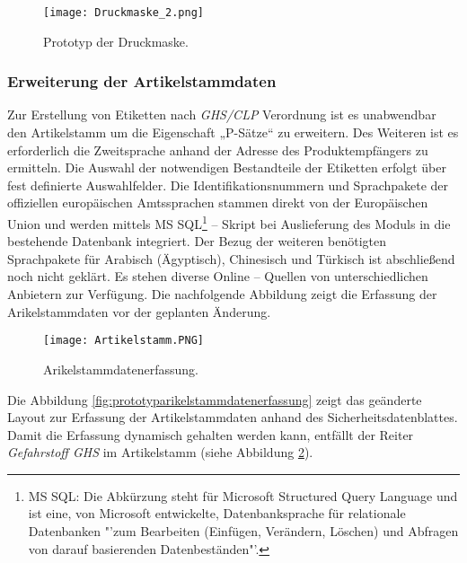 \begin{figure}[H]
    \centering
    \texttt{[image: Druckmaske\_2.png]}
    \caption[Prototyp der Druckmaske]{\small{Prototyp der Druckmaske. \cite{fzp}}}
    \label{fig:prototypdruckmaske}
\end{figure}

\subsubsection{Erweiterung der Artikelstammdaten}
\label{subsubsec:erweiterungartikelstamm}

Zur Erstellung von Etiketten nach \emph{GHS/CLP} Verordnung ist es unabwendbar den 
Artikelstamm um die Eigenschaft „P-Sätze“ zu erweitern. Des Weiteren ist es 
erforderlich die Zweitsprache anhand der Adresse des Produktempfängers zu ermitteln. 
Die Auswahl der notwendigen Bestandteile der Etiketten erfolgt über fest 
definierte Auswahlfelder. Die Identifikationsnummern und Sprachpakete der 
offiziellen europäischen Amtssprachen stammen direkt von der Europäischen Union 
und werden mittels MS SQL\footnote{\label{foot:mssql}MS SQL: Die Abkürzung steht 
für Microsoft Structured Query Language und ist eine, von Microsoft entwickelte, 
Datenbanksprache für relationale Datenbanken "'zum Bearbeiten (Einfügen, Verändern, 
Löschen) und Abfragen von darauf basierenden Datenbeständen"'\cite{mssql}.}
– Skript bei Auslieferung des Moduls in die bestehende 
Datenbank integriert. Der Bezug der weiteren benötigten Sprachpakete für 
Arabisch (Ägyptisch), Chinesisch und Türkisch ist abschließend noch nicht 
geklärt. Es stehen diverse Online – Quellen von unterschiedlichen Anbietern zur Verfügung.
Die nachfolgende Abbildung zeigt die Erfassung der Arikelstammdaten vor der
geplanten Änderung.

\begin{figure}[H]
    \centering
    \texttt{[image: Artikelstamm.PNG]}
    \caption[Arikelstammdatenerfassung]{\small{Arikelstammdatenerfassung. \cite{fzp}}}
    \label{fig:arikelstammdatenerfassung}
\end{figure}

\noindent
Die Abbildung \ref{fig:prototyparikelstammdatenerfassung} zeigt das geänderte Layout 
zur Erfassung der Artikelstammdaten anhand des Sicherheitsdatenblattes. Damit die 
Erfassung dynamisch gehalten werden kann, entfällt der Reiter \emph{Gefahrstoff GHS} 
im Artikelstamm (siehe Abbildung \ref{fig:arikelstammdatenerfassung}).

